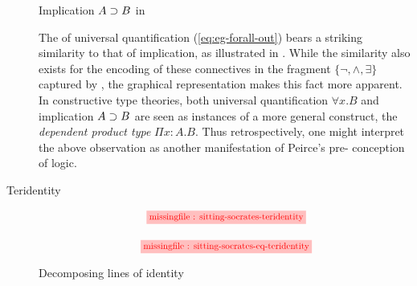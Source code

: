 \begin{scope}
\begin{description}
  \begin{marginfigure}
    \begin{center}
    \end{center}
    \caption{Implication $A \supset B$ in }
  \end{marginfigure}
  
  \begin{remark}
    
    The  of universal quantification (\ref{eq:eg-forall-out}) bears a
    striking similarity to that of implication, as illustrated in
    . While the similarity also exists for the 
    encoding of these connectives in the fragment $\{\neg, \land, \exists\}$
    captured by , the graphical representation makes this fact more
    apparent. In constructive type theories, both universal quantification
    $\forall x. B$ and implication $A \supset B$ are seen as instances of a more
    general construct, the \emph{dependent product type} $\Pi x : A. B$. Thus
    retrospectively, one might interpret the above observation as another
    manifestation of Peirce's pre- conception of logic.
  \end{remark}

  \item[Teridentity]
  
  \begin{marginfigure}
    \begin{gather}
    \tikzfig{0.8}{0.5}{sitting-socrates-teridentity} \label{eq:sitting-socrates-teridentity} \\[1em]
    \tikzfig{0.8}{0.5}{sitting-socrates-eq-teridentity} \label{eq:sitting-socrates-eq-teridentity}
    \end{gather}
    \caption{Decomposing lines of identity}
  \end{marginfigure}


\end{description}
\end{scope}
